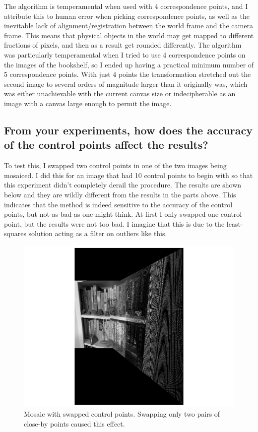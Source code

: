 \documentclass[]{article}
\begin{document}
	The algorithm is temperamental when used with 4 correspondence points, and I attribute this to human error when picking correspondence points, as well as the inevitable lack of alignment/registration between the world frame and the camera frame. This means that physical objects in the world may get mapped to different fractions of pixels, and then as a result get rounded differently. The algorithm was particularly temperamental when I tried to use 4 correspondence points on the images of the bookshelf, so I ended up having a practical minimum number of 5 correspondence points. With just 4 points the transformation stretched out the second image to several orders of magnitude larger than it originally was, which was either unachievable with the current canvas size or indecipherable as an image with a canvas large enough to permit the image.
		
	\subsection{From your experiments, how does the accuracy of the control points affect the results?}
		To test this, I swapped two control points in one of the two images being mosaiced. I did this for an image that had 10 control points to begin with so that this experiment didn't completely derail the procedure. The results are shown below and they are wildly different from the results in the parts above. This indicates that the method is indeed sensitive to the accuracy of the control points, but not as bad as one might think. At first I only swapped one control point, but the results were not too bad. I imagine that this is due to the least-squares solution acting as a filter on outliers like this. 
		
		\begin{figure}[H]
			\centering
			\includegraphics[width=6.5in]{test_images/shelf_10_mismatch.png}
			\caption{Mosaic with swapped control points. Swapping only two pairs of close-by points caused this effect.}
		\end{figure}
\end{document}
